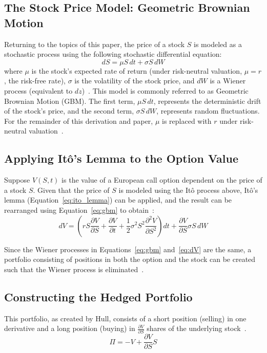 \documentclass[12pt, onecolumn, journal]{IEEEtran}
\begin{document}
\subsection{The Stock Price Model: Geometric Brownian Motion}
Returning to the topics of this paper, the price of a stock $S$ is modeled as a stochastic process using the following stochastic differential equation:
\begin{equation}
    dS = \mu S\, dt + \sigma S\, dW
    \label{eq:gbm}
\end{equation}
where $\mu$ is the stock's expected rate of return (under risk-neutral valuation, $\mu = r$, the risk-free rate), $\sigma$ is the volatility of the stock price, and $dW$ is a Wiener process (equivalent to $dz$)~\cite{Hull2022, Shreve2004}. This model is commonly referred to as Geometric Brownian Motion (GBM). The first term, $\mu S\, dt$, represents the deterministic drift of the stock's price, and the second term, $\sigma S\, dW$, represents random fluctuations. For the remainder of this derivation and paper, $\mu$ is replaced with $r$ under risk-neutral valuation~\cite{Hull2022}. 

\subsection{Applying It\^{o}'s Lemma to the Option Value}
Suppose $V(S, t)$ is the value of a European call option dependent on the price of a stock $S$. Given that the price of $S$ is modeled using the It\^{o} process above, It\^{o}'s lemma (Equation~\ref{eq:ito_lemma}) can be applied, and the result can be rearranged using Equation~\ref{eq:gbm} to obtain~\cite{Hull2022}:
\begin{equation}
    dV = \left(rS\frac{\partial V}{\partial S} + \frac{\partial V}{\partial t} + \frac{1}{2}\sigma^2 S^2 \frac{\partial^2 V}{\partial S^2}\right)dt + \frac{\partial V}{\partial S}\sigma S\,dW
    \label{eq:dV}
\end{equation}

Since the Wiener processes in Equations~\ref{eq:gbm} and~\ref{eq:dV} are the same, a portfolio consisting of positions in both the option and the stock can be created such that the Wiener process is eliminated~\cite{Hull2022}.

\subsection{Constructing the Hedged Portfolio}
This portfolio, as created by Hull, consists of a short position (selling) in one derivative and a long position (buying) in $\frac{\partial V}{\partial S}$ shares of the underlying stock~\cite{Hull2022}.
\begin{equation}
    \Pi = -V + \frac{\partial V}{\partial S} S
    \label{eq:hedged_portfolio}
\end{equation}
\end{document}
